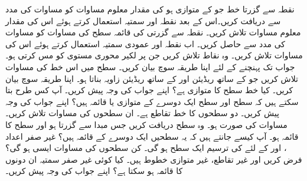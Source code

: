نقطہ  سے گزرتا خط جو  کے متوازی ہو کی مقدار معلوم مساوات   کو مساوات  کی مدد سے  دریافت کریں۔اس کے بعد نقطہ  اور سمتیہ  استعمال کرتے ہوئے اس کی مقدار معلوم مساوات تلاش کریں۔
نقطہ  سے گزرتی  کی قائمہ سطح کی مساوات کو  مساوات کی مدد سے حاصل کریں۔ اب نقطہ  اور عمودی سمتیہ  استعمال کرتے ہوئے اس کی مساوات تلاش کریں۔
وہ نقاط تلاش کریں جن پر لکیر  محوری مستوی کو مس کرتی ہو۔ جواب تک پہنچنے کے لئے اپنا   طریقہ سوچ بیان کریں۔
سطح  میں اس خط کی مساوات تلاش کریں جو  کے ساتھ  ریڈیئن اور  کے ساتھ  ریڈیئن زاویہ بناتا ہو۔ اپنا طریقہ سوچ بیان کریں۔
کیا خط  سطح  کا متوازی ہے؟ اپنے جواب کی وجہ پیش کریں۔
آپ کس طرح بتا سکتے ہیں کہ سطح  اور سطح  ایک دوسرے کے متوازی  یا قائمہ ہیں؟ اپنے جواب کی وجہ پیش کریں۔
دو سطحوں کا خط تقاطع  ہے۔  ان سطحوں کی مساوات تلاش کریں۔ مساوات کی صورت  ہو۔
وہ سطح دریافت کریں جس مبدا سے گزرتا ہو اور سطح  کا قائمہ ہو۔ آپ کیسے جانتے ہیں کہ یہ سطحیں ایک دوسرے کے قائمہ ہیں؟
غیر صفر اعداد ،  اور  کے لئے  کی ترسیم ایک سطح ہو گی۔ کن سطحوں کی مساوات ایسی ہو گی؟
فرض کریں  اور  غیر  تقاطع، غیر متوازی خطوط ہیں۔ کیا کوئی غیر صفر سمتیہ ان دونوں کا قائمہ ہو سکتا ہے؟ اپنے جواب کی وجہ پیش کریں۔
